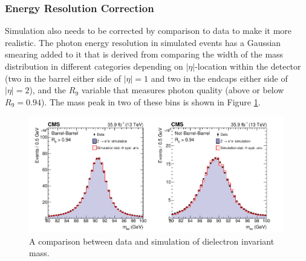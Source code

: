 \subsubsection{Energy Resolution Correction}
Simulation also needs to be corrected by comparison to data to make it more realistic. The photon energy resolution in simulated events has a Gaussian smearing added to it that is derived from comparing the width of the \Zee mass distribution in different categories depending on $|\eta|$-location within the detector (two in the barrel either side of $|\eta|=1$ and two in the endcaps either side of $|\eta|=2$), and the $R_{9}$ variable that measures photon quality (above or below $R_{9}=0.94$).
The mass peak in two of these bins is shown in Figure \ref{fig:object_reco:invariant_mass_validation}.
\begin{figure}[h!]
    \centering
    \includegraphics[width=0.99\textwidth]{figures/object_reco/CMS-HIG-16-040_Figure_001.pdf}
    \caption{A comparison between data and simulation of dielectron invariant mass.}
        \label{fig:object_reco:invariant_mass_validation}
\end{figure}


